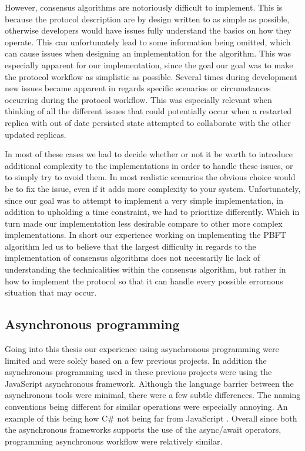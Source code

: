 However, consensus algorithms are notoriously difficult to implement. This is because the protocol description are by design written to as simple as possible, otherwise developers would have issues fully understand the basics on how they operate. This can unfortunately lead to some information being omitted, which can cause issues when designing an implementation for the algorithm. This was especially apparent for our implementation, since the goal our goal was to make the protocol workflow as simplistic as possible. Several times during development new issues became apparent in regards specific scenarios or circumstances occurring during the protocol workflow. This was especially relevant when thinking of all the different issues that could potentially occur when a restarted replica with out of date persisted state attempted to collaborate with the other updated replicas. 

In most of these cases we had to decide whether or not it be worth to introduce additional complexity to the implementations in order to handle these issues, or to simply try to avoid them. In most realistic scenarios the obvious choice would be to fix the issue, even if it adds more complexity to your system. Unfortunately, since our goal was to attempt to implement a very simple implementation, in addition to upholding a time constraint, we had to prioritize differently. Which in turn made our implementation less desirable compare to other more complex implementations. In short our experience working on implementing the PBFT algorithm led us to believe that the largest difficulty in regards to the implementation of consensus algorithms does not necessarily lie lack of understanding the technicalities within the consensus algorithm, but rather in how to implement the protocol so that it can handle every possible errornous situation that may occur.

\subsection{Asynchronous programming}
Going into this thesis our experience using asynchronous programming were limited and were solely based on a few previous projects. In addition the asynchronous programming used in these previous projects were using the JavaScript asynchronous framework. Although the language barrier between the asynchronous tools were minimal, there were a few subtle differences. The naming conventions being different for similar operations were especially annoying. An example of this being how C\#  not being far from JavaScript . Overall since both the asynchronous frameworks supports the use of the async/await operators, programming asynchronous workflow were relatively similar. 

